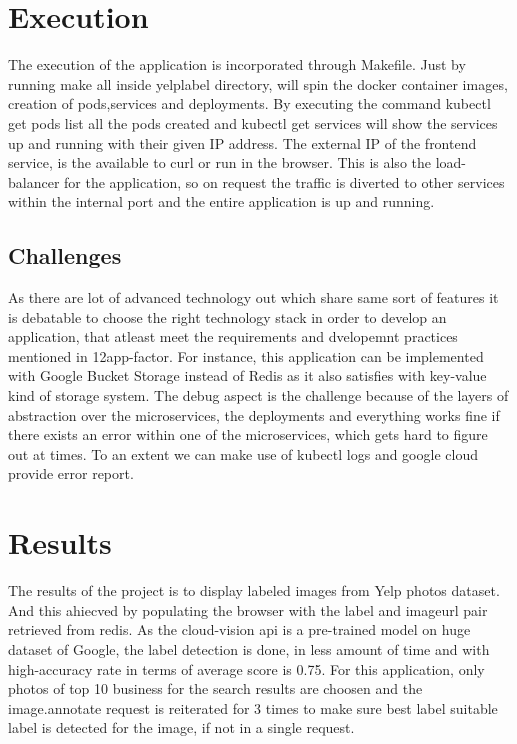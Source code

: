 \section{Execution}

The execution of the application is incorporated through
Makefile. Just by running make all inside yelplabel directory, will
spin the docker container images, creation of pods,services and
deployments. By executing the command kubectl get pods list all the
pods created and kubectl get services will show the services up and
running with their given IP address. The external IP of the frontend
service, is the available to curl or run in the browser. This is also
the load-balancer for the application, so on request the traffic is
diverted to other services within the internal port and the entire
application is up and running.
  
\subsection{Challenges}

As there are lot of advanced technology out which share same sort of
features it is debatable to choose the right technology stack in order
to develop an application, that atleast meet the requirements and
dvelopemnt practices mentioned in 12app-factor. For instance, this
application can be implemented with Google Bucket Storage instead of
Redis as it also satisfies with key-value kind of storage system.  The
debug aspect is the challenge because of the layers of abstraction
over the microservices, the deployments and everything works fine if
there exists an error within one of the microservices, which gets hard
to figure out at times. To an extent we can make use of kubectl logs
and google cloud provide error report.
  
\section{Results}

The results of the project is to display labeled images from Yelp
photos dataset. And this ahiecved by populating the browser with the
label and imageurl pair retrieved from redis. As the cloud-vision api
is a pre-trained model on huge dataset of Google, the label detection
is done, in less amount of time and with high-accuracy rate in terms
of average score is 0.75. For this application, only photos of top 10
business for the search results are choosen and the image.annotate
request is reiterated for 3 times to make sure best label suitable
label is detected for the image, if not in a single request.

